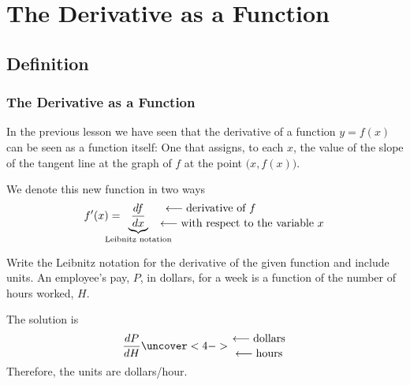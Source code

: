 \documentclass[9pt,xcolor=x11names,compress]{beamer}
\begin{document}
\section{The Derivative as a Function}
\subsection{Definition}
\begin{frame}\frametitle{The Derivative as a Function}
In the previous lesson we have seen that the derivative of a function $y=f(x)$ can be seen as a function itself: One that assigns, to each $x$, the value of the slope of the tangent line at the graph of $f$ at the point $\big(x,f(x)\big)$.

We denote this new function in two ways
\begin{equation*}
	f'(x) = \!\!\!\!\!\!\!\!\!\! \underbrace{\frac{df}{dx}}_{\text{Leibnitz notation}} \!\!\!\!\!\!\!\! \genfrac{}{}{0pt}{}{\longleftarrow \text{derivative of }f \hspace{2cm}}{\longleftarrow\text{with respect to the variable }x}
\end{equation*}
\pause
\begin{block}{
	Write the Leibnitz notation for the derivative of the given function and include units.
}
An employee's pay, $P$, in dollars, for a week is a function of the number of hours worked, $H$.
\end{block}
\pause The solution is 
\begin{equation*}
	\frac{dP}{dH} \uncover<4->{\genfrac{}{}{0pt}{}{\longleftarrow \text{dollars}}{\longleftarrow \text{hours}}}
\end{equation*}
\pause\pause Therefore, the units are \alert{dollars/hour}.
\end{frame}
\end{document}
